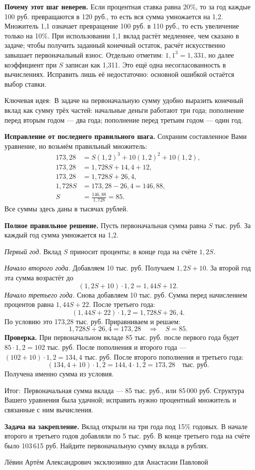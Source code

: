 \documentclass[12pt,a4paper]{article}
\newcommand{\idea}{\textcolor{blue!60!black}{Ключевая идея:}}
\newcommand{\result}{\textcolor{teal!60!black}{Итог:}}
\begin{document}
\textbf{Почему этот шаг неверен.} Если процентная ставка равна 20\%, то за год каждые 100 руб. превращаются в 120 руб., то есть вся сумма умножается на 1,2. Множитель 1,1 означает превращение 100 руб. в 110 руб., то есть увеличение только на 10\%. При использовании 1,1 вклад растёт медленнее, чем сказано в задаче; чтобы получить заданный конечный остаток, расчёт искусственно завышает первоначальный взнос. Отдельно отметим: $1{,}1^3=1{,}331$, но далее коэффициент при $S$ записан как 1,311. Это ещё одна несогласованность в вычислениях. Исправить лишь её недостаточно: основной ошибкой остаётся выбор ставки.

\idea\ В задаче на первоначальную сумму удобно выразить конечный вклад как сумму трёх частей: начальные деньги работают три года; пополнение перед вторым годом --- два года; пополнение перед третьим годом --- один год.

\textbf{Исправление от последнего правильного шага.} Сохраним составленное Вами уравнение, но возьмём правильный множитель:
\begin{align*}
173{,}28&=S(1{,}2)^3+10(1{,}2)^2+10(1{,}2),\\
173{,}28&=1{,}728S+14{,}4+12,\\
173{,}28&=1{,}728S+26{,}4,\\
1{,}728S&=173{,}28-26{,}4=146{,}88,\\
S&=\frac{146{,}88}{1{,}728}=85.
\end{align*}
Все суммы здесь даны в тысячах рублей.

\textbf{Полное правильное решение.} Пусть первоначальная сумма равна $S$ тыс. руб. За каждый год сумма умножается на 1,2.

\textit{Первый год.} Вклад $S$ приносит проценты; в конце года на счёте $1{,}2S$.

\textit{Начало второго года.} Добавляем 10 тыс. руб. Получаем $1{,}2S+10$. За второй год эта сумма возрастёт до
\[
(1{,}2S+10)\cdot1{,}2=1{,}44S+12.
\]
\textit{Начало третьего года.} Снова добавляем 10 тыс. руб. Сумма перед начислением процентов равна $1{,}44S+22$. После третьего года:
\[
(1{,}44S+22)\cdot1{,}2=1{,}728S+26{,}4.
\]
По условию это 173,28 тыс. руб. Приравниваем и решаем:
\[
1{,}728S+26{,}4=173{,}28
\quad\Longrightarrow\quad S=85.
\]
\textbf{Проверка.} При первоначальном вкладе 85 тыс. руб. после первого года будет $85\cdot1{,}2=102$ тыс. руб. После пополнения и второго года --- $(102+10)\cdot1{,}2=134{,}4$ тыс. руб. После второго пополнения и третьего года:
\[
(134{,}4+10)\cdot1{,}2=144{,}4\cdot1{,}2=173{,}28
\quad\text{тыс. руб.}
\]
Получена именно сумма из условия.

\result\ Первоначальная сумма вклада --- 85 тыс. руб., или 85\,000 руб. Структура Вашего уравнения была удачной; исправить нужно процентный множитель и связанные с ним вычисления.

\textbf{Задача на закрепление.} Вклад открыли на три года под 15\% годовых. В начале второго и третьего годов добавляли по 5 тыс. руб. В конце третьего года на счёте было 103\,615 руб. Найдите первоначальную сумму вклада в рублях.

\vfill
\begin{center}\footnotesize Лёвин Артём Александрович эксклюзивно для Анастасии Павловой\end{center}
\end{document}
